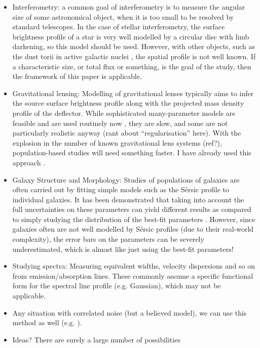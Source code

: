 \documentclass[letterpaper, 11pt]{article}
\begin{document}
\begin{itemize}
\item Interferometry: a common goal of interferometry is to measure the angular size of some astronomical object, when it is too small to be resolved by standard telescopes. In the case of stellar interferometry, the surface brightness profile of a star is very well modelled by a circular disc with limb darkening, so this model should be used. However, with other objects, such as the dust torii in active galactic nuclei \citep[e.g.][]{2011A&A...536A..78K}, the spatial profile is not well known. If a characteristic size, or total flux or something, is the goal of the study, then the framework of this paper is applicable.\\

\item Gravitational lensing: Modelling of gravitational lenses typically aims to infer the source surface brightness profile along with the projected mass density profile of the deflector. While sophisticated many-parameter models are feasible and are used routinely now \citep{2006MNRAS.371..983S, 2007ApJ...666..726B, 2011MNRAS.412.2521B, 2006ApJ...637..608B, 2012Natur.481..341V}, they are slow, and some are not particularly realistic anyway (rant about ``regularisation'' here). With the explosion in the number of known gravitational lens systems (ref?), population-based studies will need something faster. I have already used this approach \citep{2012arXiv1201.1677B}.

\item Galaxy Structure and Morphology: Studies of populations of galaxies are often carried out by fitting simple models such as the S{\'e}rsic \citep{Sersic1968} profile to individual galaxies. It has been demonstrated that taking into account the full uncertainties on these parameters can yield different results as compared to simply studying the distribution of the best-fit parameters \citep[e.g.][]{2011MNRAS.414.1625Y}. However, since galaxies often are not well modelled by S{\'e}rsic profiles (due to their real-world complexity), the error bars on the parameters can be severely underestimated, which is almost like just using the best-fit parameters! \\

\item Studying spectra: Measuring equivalent widths, velocity dispersions and so on from emission/absorption lines. These commonly assume a specific functional form for the spectral line profile (e.g. Gaussian), which may not be applicable.

\item Any situation with correlated noise (but a believed model), we can use this method as well (e.g. \citep{2008ApJ...686..851R}).

\item Ideas? There are surely a large number of possibilities
\end{itemize}
\end{document}
